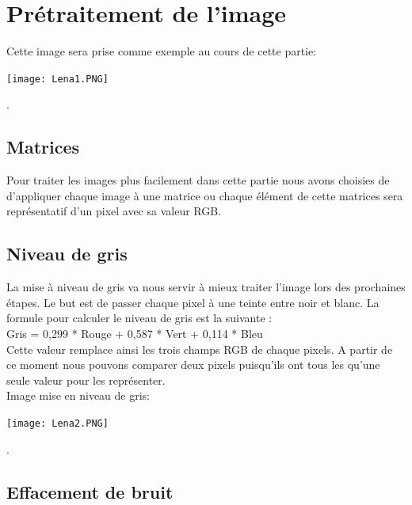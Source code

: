 \documentclass [french,12pt]{article}
\begin{document}
\section{Prétraitement de l'image}

Cette image sera prise comme exemple au cours de cette partie:
\\
\begin{center} \texttt{[image: Lena1.PNG]} \end{center}.
\\

\subsection{Matrices}

Pour traiter les images plus facilement dans cette partie nous avons choisies de d’appliquer chaque image à une matrice ou chaque élément de cette matrices sera représentatif d’un pixel avec sa valeur RGB.

\subsection{Niveau de gris}

La mise à niveau de gris va nous servir à mieux traiter l’image lors des prochaines étapes. Le but est de passer chaque pixel à une teinte entre noir et blanc.  La formule pour calculer le niveau de gris est la suivante :
	\\Gris = 0,299 * Rouge + 0,587 * Vert + 0,114 * Bleu
	\\Cette valeur remplace ainsi les trois champs RGB de chaque pixels. A partir de ce moment nous pouvons comparer deux pixels puisqu’ils ont tous les qu’une seule valeur pour les représenter.
\\
Image mise en niveau de gris:
\\
\begin{center} \texttt{[image: Lena2.PNG]} \end{center}.
\\

\subsection{Effacement de bruit}
\end{document}
